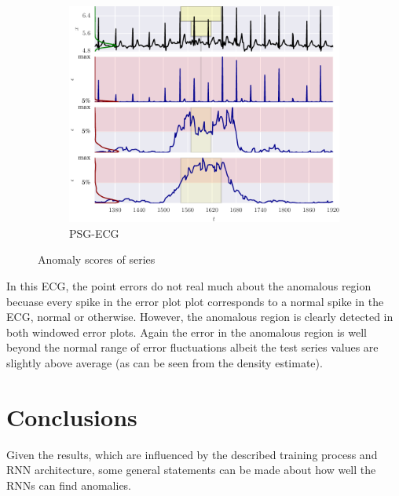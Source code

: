 
\begin{figure}[!hp] 
    \ContinuedFloat

    \begin{subfigure}[t]{\textwidth} 
        \centering
        \includegraphics[]{figs/er_sleep.pdf}
        \caption{PSG-ECG}
    \end{subfigure}%

\label{fig:err}
\caption{Anomaly scores of series} 
\end{figure}

In this ECG, the point errors do not real much about the anomalous region becuase every spike in the error plot plot corresponds to a normal spike in the ECG, normal or otherwise.
%
However, the anomalous region is clearly detected in both windowed error plots.
%
Again the error in the anomalous region is well beyond the normal range of error fluctuations albeit the test series values are slightly above average (as can be seen from the density estimate).


\section[]{Conclusions}

Given the results, which are influenced by the described training process and RNN architecture, some general statements can be made about how well the RNNs can find anomalies.


